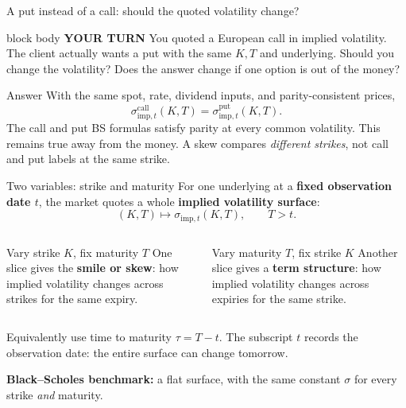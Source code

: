 \documentclass[handout,10pt,aspectratio=169]{beamer}
\newenvironment{pausebox}{\begin{beamercolorbox}[rounded=true,sep=0.8em,wd=\textwidth]{block body}
  \textbf{\color{CourseGold}YOUR TURN}\quad}{\end{beamercolorbox}}
\newcommand{\1}{\mathbf 1}
\begin{document}
\begin{frame}{A put instead of a call: should the quoted volatility change?}
\begin{pausebox}
You quoted a European call in implied volatility. The client actually wants
a put with the same \(K,T\) and underlying. Should you change the volatility?
Does the answer change if one option is out of the money?
\end{pausebox}

\begin{exampleblock}{Answer}
With the same spot, rate, dividend inputs, and parity-consistent prices,
\[
\boxed{\sigma_{\mathrm{imp},t}^{\mathrm{call}}(K,T)
=\sigma_{\mathrm{imp},t}^{\mathrm{put}}(K,T).}
\]
The call and put BS formulas satisfy parity at every common volatility.
This remains true away from the money. A skew compares \emph{different
strikes}, not call and put labels at the same strike.
\end{exampleblock}
\end{frame}

\begin{frame}{Two variables: strike and maturity}
For one underlying at a \textbf{fixed observation date \(t\)}, the market
quotes a whole \textbf{implied volatility surface}:
\[
\boxed{(K,T)\longmapsto\sigma_{\mathrm{imp},t}(K,T),\qquad T>t.}
\]
\begin{columns}[T,onlytextwidth]
\begin{block}{Vary strike \(K\), fix maturity \(T\)}
One slice gives the \textbf{smile or skew}: how implied volatility changes
across strikes for the same expiry.
\end{block}
\begin{block}{Vary maturity \(T\), fix strike \(K\)}
Another slice gives a \textbf{term structure}: how implied volatility changes
across expiries for the same strike.
\end{block}
\end{columns}
Equivalently use time to maturity \(\tau=T-t\). The subscript \(t\) records
the observation date: the entire surface can change tomorrow.
\smallskip

\textbf{Black--Scholes benchmark:} a flat surface, with the same constant
\(\sigma\) for every strike \emph{and} maturity.
\end{frame}
\end{document}
